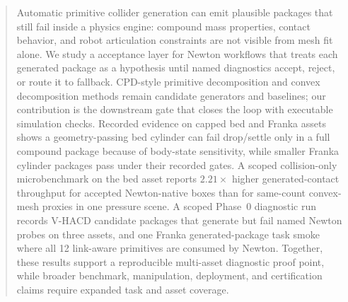 \begin{abstract}
Automatic primitive collider generation can emit plausible packages that still fail inside a physics engine: compound mass properties, contact behavior, and robot articulation constraints are not visible from mesh fit alone.
We study a \simchecked{} acceptance layer for Newton workflows that treats each generated package as a hypothesis until named diagnostics accept, reject, or route it to fallback.
CPD-style primitive decomposition and convex decomposition methods remain candidate generators and baselines; our contribution is the downstream gate that closes the loop with executable simulation checks.
Recorded evidence on capped bed and Franka assets shows a geometry-passing bed cylinder can fail drop/settle only in a full compound package because of body-state sensitivity, while smaller Franka cylinder packages pass under their recorded gates.
A scoped collision-only microbenchmark on the bed asset reports $2.21\times$ higher generated-contact throughput for accepted Newton-native boxes than for same-count convex-mesh proxies in one pressure scene.
A scoped Phase~0 diagnostic run records V-HACD candidate packages that generate but fail named Newton probes on three assets, and one Franka generated-package task smoke where all 12 link-aware primitives are consumed by Newton.
Together, these results support a reproducible multi-asset diagnostic proof point, while broader benchmark, manipulation, deployment, and certification claims require expanded task and asset coverage.
\end{abstract}
